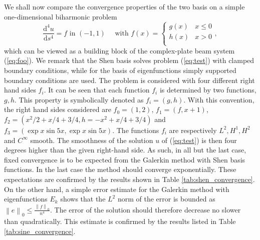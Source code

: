 \documentclass{marine_2015}
\newcommand{\inner}[2]{\ensuremath{\left(#1, #2\right)}}
\newcommand{\norm}[1]{\ensuremath{\left\|#1\right\|}}
\newcommand{\deriv}[2]{\ensuremath{\frac{\mathrm{d}#1}{\mathrm{d}#2}}}
\begin{document}
We shall now compare the convergence properties of the two basis on a simple 
one-dimensional biharmonic problem
\begin{equation}
  \label{eq:test}
  \deriv{^4u}{s^4} = f\text{ in }\left(-1, 1 \right)\quad\text{ with }f(x)=\begin{cases}
      g(x) & x \leq 0 \\
      h(x) & x > 0 \\
    \end{cases},
  \end{equation}
which can be viewed as a building block of the complex-plate beam system (\ref{eq:foo}).
We remark that the Shen basis solves problem (\ref{eq:test}) with clamped
boundary conditions, while for the basis of eigenfunctions simply supported
boundary conditions are used. The problem is considered with four different right 
hand sides $f_i$. It can be seen that each function $f_i$ is determined by two functions, $g, h$. This
property is symbolically denoted as $f_i=\left(g, h\right)$. With this
convention, the right hand sides considered are $f_0=\inner{1}{2}$, $f_1=\inner{f}{x+1}$,
$f_2=\inner{x^2/2 + x/4 + 3/4}{h=-x^2 + x/4 + 3/4}$ and
$f_3=\inner{\exp{x}\sin{5x}}{\exp{x}\sin{5x}}$. The functions $f_i$ are
respectively $L^2, H^1, H^2$ and $C^{\infty}$ smooth. The smoothness of the
solution $u$ of (\ref{eq:test}) is then four degrees higher than the given
right-hand side. As such, in all but the last case, fixed convergence is to be
expected from the Galerkin method with Shen basis functions. In the last case
the method should converge exponentially. These expectations are confirmed by
the results shown in Table \ref{tab:shen_convergence}. On the other hand, a simple error
estimate for the Galerkin method with eigenfunctions $E_k$ shows that the $L^2$
norm of the error is bounded as $\norm{e}_0\leq\tfrac{\norm{f}_0}{n^4}$. The
error of the solution should therefore decrease no slower than quadratically.
This estimate is confirmed by the results listed in Table
\ref{tab:sine_convergence}.
\end{document}
